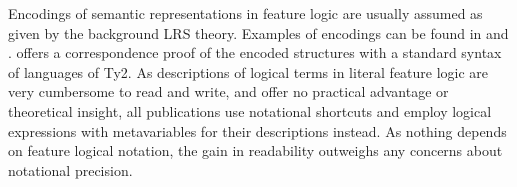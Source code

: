 \documentclass[output=paper]{langsci/langscibook}
\begin{document}
Encodings of semantic representations in feature logic are usually assumed as given by the background LRS theory. Examples of encodings can be found in \citet{Sailer2000a} and \citet{Richter2004a-u}. \citet{Sailer2000a} offers a correspondence proof of the encoded structures with a standard syntax of languages of Ty2. As descriptions of logical terms in literal feature logic are very cumbersome to read and write, and offer no practical advantage or theoretical insight, all publications use notational shortcuts and employ logical expressions with metavariables for their descriptions instead. As nothing depends on feature logical notation, the gain in readability outweighs any concerns about notational precision.

 

\printbibliography[heading=subbibliography,notkeyword=this] 
\end{document}
